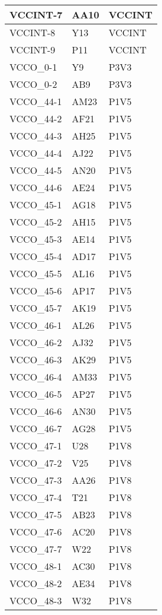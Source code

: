 \begin{footnotesize}
\begin{longtable}{|p{7cm}|p{1cm}|p{5cm}|}
VCCINT-7	&	AA10	&	VCCINT	\\ \hline
VCCINT-8	&	Y13	&	VCCINT	\\ \hline
VCCINT-9	&	P11	&	VCCINT	\\ \hline
VCCO\_0-1	&	Y9	&	P3V3	\\ \hline
VCCO\_0-2	&	AB9	&	P3V3	\\ \hline
VCCO\_44-1	&	AM23	&	P1V5	\\ \hline
VCCO\_44-2	&	AF21	&	P1V5	\\ \hline
VCCO\_44-3	&	AH25	&	P1V5	\\ \hline
VCCO\_44-4	&	AJ22	&	P1V5	\\ \hline
VCCO\_44-5	&	AN20	&	P1V5	\\ \hline
VCCO\_44-6	&	AE24	&	P1V5	\\ \hline
VCCO\_45-1	&	AG18	&	P1V5	\\ \hline
VCCO\_45-2	&	AH15	&	P1V5	\\ \hline
VCCO\_45-3	&	AE14	&	P1V5	\\ \hline
VCCO\_45-4	&	AD17	&	P1V5	\\ \hline
VCCO\_45-5	&	AL16	&	P1V5	\\ \hline
VCCO\_45-6	&	AP17	&	P1V5	\\ \hline
VCCO\_45-7	&	AK19	&	P1V5	\\ \hline
VCCO\_46-1	&	AL26	&	P1V5	\\ \hline
VCCO\_46-2	&	AJ32	&	P1V5	\\ \hline
VCCO\_46-3	&	AK29	&	P1V5	\\ \hline
VCCO\_46-4	&	AM33	&	P1V5	\\ \hline
VCCO\_46-5	&	AP27	&	P1V5	\\ \hline
VCCO\_46-6	&	AN30	&	P1V5	\\ \hline
VCCO\_46-7	&	AG28	&	P1V5	\\ \hline
VCCO\_47-1	&	U28	&	P1V8	\\ \hline
VCCO\_47-2	&	V25	&	P1V8	\\ \hline
VCCO\_47-3	&	AA26	&	P1V8	\\ \hline
VCCO\_47-4	&	T21	&	P1V8	\\ \hline
VCCO\_47-5	&	AB23	&	P1V8	\\ \hline
VCCO\_47-6	&	AC20	&	P1V8	\\ \hline
VCCO\_47-7	&	W22	&	P1V8	\\ \hline
VCCO\_48-1	&	AC30	&	P1V8	\\ \hline
VCCO\_48-2	&	AE34	&	P1V8	\\ \hline
VCCO\_48-3	&	W32	&	P1V8	\\ \hline

\end{longtable}
\end{footnotesize}

